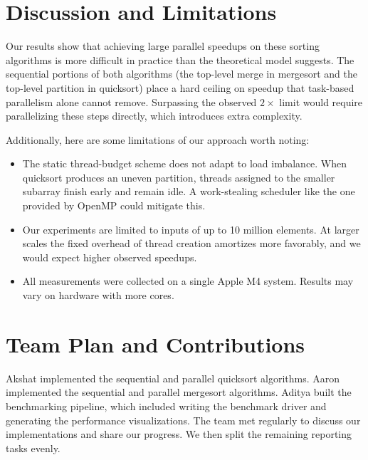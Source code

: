 \documentclass[letterpaper]{article}
\begin{document}
\section{Discussion and Limitations}
Our results show that achieving large parallel speedups on these sorting algorithms is more difficult in practice than the theoretical model suggests. The sequential portions of both algorithms (the top-level merge in mergesort and the top-level partition in quicksort) place a hard ceiling on speedup that task-based parallelism alone cannot remove. Surpassing the observed $2\times$ limit would require parallelizing these steps directly, which introduces extra complexity.

Additionally, here are some limitations of our approach worth noting:
\begin{itemize}
    \item The static thread-budget scheme does not adapt to load imbalance. When quicksort produces an uneven partition, threads assigned to the smaller subarray finish early and remain idle. A work-stealing scheduler like the one provided by OpenMP could mitigate this.
    \item Our experiments are limited to inputs of up to 10 million elements. At larger scales the fixed overhead of thread creation amortizes more favorably, and we would expect higher observed speedups.
    \item All measurements were collected on a single Apple M4 system. Results may vary on hardware with more cores.
\end{itemize}

\section{Team Plan and Contributions}
Akshat implemented the sequential and parallel quicksort algorithms. Aaron implemented the sequential and parallel mergesort algorithms. Aditya built the benchmarking pipeline, which included writing the benchmark driver and generating the performance visualizations. The team met regularly to discuss our implementations and share our progress. We then split the remaining reporting tasks evenly.
\end{document}
